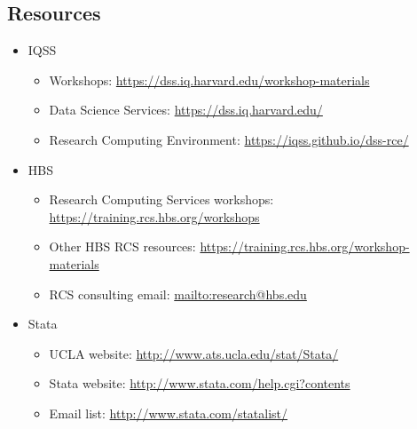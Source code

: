 \documentclass[
]{book}
\providecommand{\tightlist}{%
  \setlength{\itemsep}{0pt}\setlength{\parskip}{0pt}}
\begin{document}
\hypertarget{resources-11}{%
\subsection{Resources}\label{resources-11}}

\begin{itemize}
\tightlist
\item
  IQSS

  \begin{itemize}
  \tightlist
  \item
    Workshops: \url{https://dss.iq.harvard.edu/workshop-materials}
  \item
    Data Science Services: \url{https://dss.iq.harvard.edu/}
  \item
    Research Computing Environment: \url{https://iqss.github.io/dss-rce/}
  \end{itemize}
\item
  HBS

  \begin{itemize}
  \tightlist
  \item
    Research Computing Services workshops: \url{https://training.rcs.hbs.org/workshops}
  \item
    Other HBS RCS resources: \url{https://training.rcs.hbs.org/workshop-materials}
  \item
    RCS consulting email: \url{mailto:research@hbs.edu}
  \end{itemize}
\item
  Stata

  \begin{itemize}
  \tightlist
  \item
    UCLA website: \url{http://www.ats.ucla.edu/stat/Stata/}
  \item
    Stata website: \url{http://www.stata.com/help.cgi?contents}
  \item
    Email list: \url{http://www.stata.com/statalist/}
  \end{itemize}
\end{itemize}

\backmatter
\end{document}
